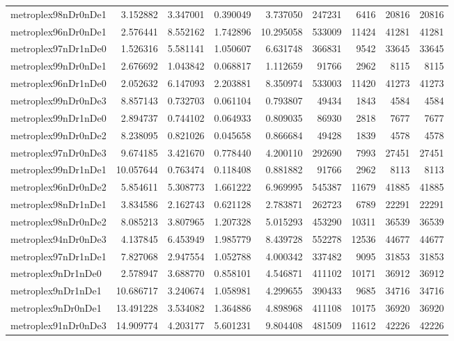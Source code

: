 \begin{longtable}{|l|r|r|r|r|r|r|r|r|}
metroplex98nDr0nDe1 & 3.152882 & 3.347001 & 0.390049 & 3.737050 & 247231 & 6416 & 20816 & 20816 \\
metroplex96nDr0nDe1 & 2.576441 & 8.552162 & 1.742896 & 10.295058 & 533009 & 11424 & 41281 & 41281 \\
metroplex97nDr1nDe0 & 1.526316 & 5.581141 & 1.050607 & 6.631748 & 366831 & 9542 & 33645 & 33645 \\
metroplex99nDr0nDe1 & 2.676692 & 1.043842 & 0.068817 & 1.112659 & 91766 & 2962 & 8115 & 8115 \\
metroplex96nDr1nDe0 & 2.052632 & 6.147093 & 2.203881 & 8.350974 & 533003 & 11420 & 41273 & 41273 \\
metroplex99nDr0nDe3 & 8.857143 & 0.732703 & 0.061104 & 0.793807 & 49434 & 1843 & 4584 & 4584 \\
metroplex99nDr1nDe0 & 2.894737 & 0.744102 & 0.064933 & 0.809035 & 86930 & 2818 & 7677 & 7677 \\
metroplex99nDr0nDe2 & 8.238095 & 0.821026 & 0.045658 & 0.866684 & 49428 & 1839 & 4578 & 4578 \\
metroplex97nDr0nDe3 & 9.674185 & 3.421670 & 0.778440 & 4.200110 & 292690 & 7993 & 27451 & 27451 \\
metroplex99nDr1nDe1 & 10.057644 & 0.763474 & 0.118408 & 0.881882 & 91766 & 2962 & 8113 & 8113 \\
metroplex96nDr0nDe2 & 5.854611 & 5.308773 & 1.661222 & 6.969995 & 545387 & 11679 & 41885 & 41885 \\
metroplex98nDr1nDe1 & 3.834586 & 2.162743 & 0.621128 & 2.783871 & 262723 & 6789 & 22291 & 22291 \\
metroplex98nDr0nDe2 & 8.085213 & 3.807965 & 1.207328 & 5.015293 & 453290 & 10311 & 36539 & 36539 \\
metroplex94nDr0nDe3 & 4.137845 & 6.453949 & 1.985779 & 8.439728 & 552278 & 12536 & 44677 & 44677 \\
metroplex97nDr1nDe1 & 7.827068 & 2.947554 & 1.052788 & 4.000342 & 337482 & 9095 & 31853 & 31853 \\
metroplex9nDr1nDe0 & 2.578947 & 3.688770 & 0.858101 & 4.546871 & 411102 & 10171 & 36912 & 36912 \\
metroplex9nDr1nDe1 & 10.686717 & 3.240674 & 1.058981 & 4.299655 & 390433 & 9685 & 34716 & 34716 \\
metroplex9nDr0nDe1 & 13.491228 & 3.534082 & 1.364886 & 4.898968 & 411108 & 10175 & 36920 & 36920 \\
metroplex91nDr0nDe3 & 14.909774 & 4.203177 & 5.601231 & 9.804408 & 481509 & 11612 & 42226 & 42226 \\

\end{longtable}
